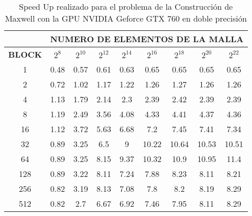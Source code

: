 \begin{table}[h!]
\centering
    \begin{tabular}{|c|c|c|c|c|c|c|c|c|}
    \hline
                   & \multicolumn{8}{c|}{\textbf{NUMERO DE ELEMENTOS DE LA MALLA}} \\ \hline
    \textbf{BLOCK} & $2^{8}$ & $2^{10}$& $2^{12}$& $2^{14}$& $2^{16}$& $2^{18}$& $2^{20}$& $2^{22}$\\ \hline
    1              & 0.48  & 0.57  & 0.61  & 0.63  & 0.65  & 0.65  & 0.65  & 0.65  \\ \hline
    2              & 0.72  & 1.02  & 1.17  & 1.22  & 1.26  & 1.27  & 1.26  & 1.26  \\ \hline
    4              & 1.13  & 1.79  & 2.14  & 2.3   & 2.39  & 2.42  & 2.39  & 2.39  \\ \hline
    8              & 1.19  & 2.49  & 3.56  & 4.08  & 4.33  & 4.41  & 4.37  & 4.36  \\ \hline
    16             & 1.12  & 3.72  & 5.63  & 6.68  & 7.2   & 7.45  & 7.41  & 7.34  \\ \hline
    32             & 0.89  & 3.25  & 6.5   & 9     & 10.22 & 10.64 & 10.53 & 10.51 \\ \hline
    64             & 0.89  & 3.25  & 8.15  & 9.37  & 10.32 & 10.9  & 10.95 & 11.4  \\ \hline
    128            & 0.89  & 3.22  & 8.11  & 7.24  & 7.88  & 8.23  & 8.11  & 8.21  \\ \hline
    256            & 0.82  & 3.19  & 8.13  & 7.08  & 7.8   & 8.2   & 8.19  & 8.29  \\ \hline
    512            & 0.82  & 2.7   & 6.67  & 6.92  & 7.46  & 7.95  & 8.11  & 8.29  \\ \hline
    \end{tabular}
    \caption{Speed Up realizado para el problema de la Construcción de Maxwell con la GPU NVIDIA Geforce GTX 760 en doble precisión}
    \label{tab:s_760_MxC_double_10}
    \end{table}